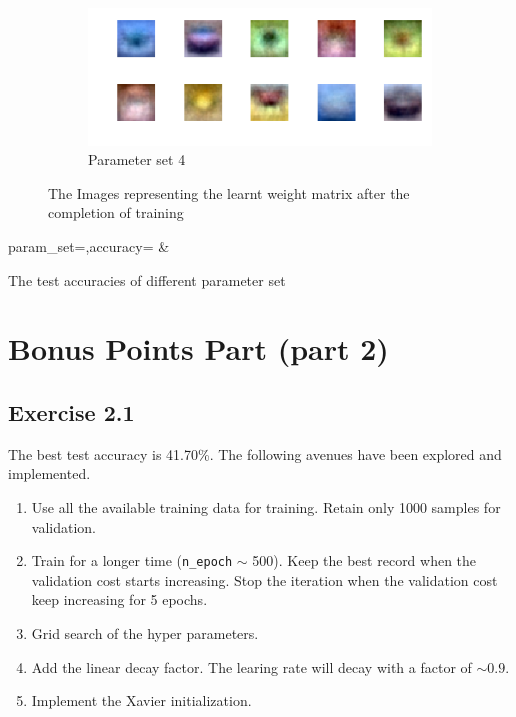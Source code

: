 \documentclass[12pt]{article}
\begin{document}
\begin{figure}
\begin{subfigure}[b]{0.475\textwidth}
        \centering
        \includegraphics[width=\textwidth]{wgt_case4.png}
        \caption[]%
        {{\small Parameter set 4}}
    \end{subfigure}
    \caption[]
    {\small The Images representing the learnt weight matrix after the completion of training}
    \label{fig:wgt_mat}
\end{figure}

\begin{table}
    \centering
    {param_set=\paramset,accuracy=\accuracy}
    {\paramset & \accuracy}
    \caption{The test accuracies of different parameter set}
    \label{table:accuracy}
\end{table}

\section{Bonus Points Part (part 2)}

\subsection{Exercise 2.1}

The best test accuracy is 41.70\%.
The following avenues have been explored and implemented.
\begin{enumerate}
    \item Use all the available training data for training. Retain only 1000 samples
        for validation.
    \item Train for a longer time (\texttt{n\_epoch} $\sim$ 500). Keep the best record
        when the validation cost starts increasing. Stop the iteration when the validation
        cost keep increasing for 5 epochs.
    \item Grid search of the hyper parameters.
    \item Add the linear decay factor. The learing rate will decay with a factor of $\sim 0.9$.
    \item Implement the Xavier initialization.
\end{enumerate}
\end{document}

